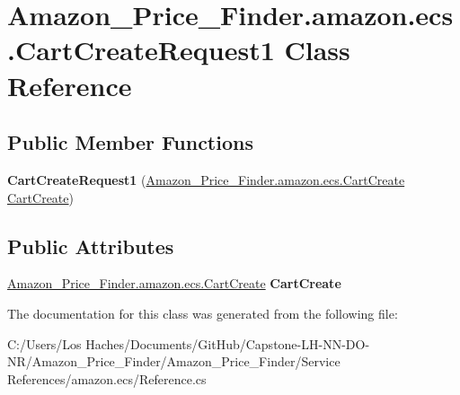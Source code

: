 \hypertarget{class_amazon___price___finder_1_1amazon_1_1ecs_1_1_cart_create_request1}{\section{Amazon\-\_\-\-Price\-\_\-\-Finder.\-amazon.\-ecs.\-Cart\-Create\-Request1 Class Reference}
\label{class_amazon___price___finder_1_1amazon_1_1ecs_1_1_cart_create_request1}
}
\subsection*{Public Member Functions}
\begin{DoxyCompactItemize}
\item 
\hypertarget{class_amazon___price___finder_1_1amazon_1_1ecs_1_1_cart_create_request1_a17e9ec368a7f5055bdf3f3c7c818785f}{{\bfseries Cart\-Create\-Request1} (\hyperlink{class_amazon___price___finder_1_1amazon_1_1ecs_1_1_cart_create}{Amazon\-\_\-\-Price\-\_\-\-Finder.\-amazon.\-ecs.\-Cart\-Create} \hyperlink{class_amazon___price___finder_1_1amazon_1_1ecs_1_1_cart_create}{Cart\-Create})}\label{class_amazon___price___finder_1_1amazon_1_1ecs_1_1_cart_create_request1_a17e9ec368a7f5055bdf3f3c7c818785f}

\end{DoxyCompactItemize}
\subsection*{Public Attributes}
\begin{DoxyCompactItemize}
\item 
\hypertarget{class_amazon___price___finder_1_1amazon_1_1ecs_1_1_cart_create_request1_a26ce10f4d33f6e535a6b72da7a53e6d4}{\hyperlink{class_amazon___price___finder_1_1amazon_1_1ecs_1_1_cart_create}{Amazon\-\_\-\-Price\-\_\-\-Finder.\-amazon.\-ecs.\-Cart\-Create} {\bfseries Cart\-Create}}\label{class_amazon___price___finder_1_1amazon_1_1ecs_1_1_cart_create_request1_a26ce10f4d33f6e535a6b72da7a53e6d4}

\end{DoxyCompactItemize}


The documentation for this class was generated from the following file\-:\begin{DoxyCompactItemize}
\item 
C\-:/\-Users/\-Los Haches/\-Documents/\-Git\-Hub/\-Capstone-\/\-L\-H-\/\-N\-N-\/\-D\-O-\/\-N\-R/\-Amazon\-\_\-\-Price\-\_\-\-Finder/\-Amazon\-\_\-\-Price\-\_\-\-Finder/\-Service References/amazon.\-ecs/Reference.\-cs\end{DoxyCompactItemize}
